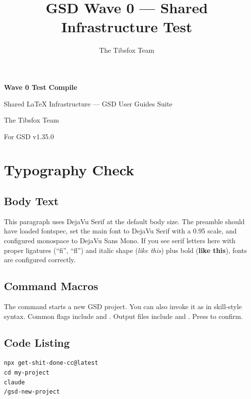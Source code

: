 \documentclass[11pt,letterpaper,openany]{book}
\title{GSD Wave 0 — Shared Infrastructure Test}
\author{The Tibsfox Team}
\begin{document}
\begin{titlepage}
\centering
\vspace*{2cm}
{\headingfont\Huge\bfseries\color{gsdnavy} Wave 0 Test Compile\par}
\vspace{0.5cm}
{\headingfont\Large Shared LaTeX Infrastructure — GSD User Guides Suite\par}
\vspace{2cm}
{\large The Tibsfox Team \par}
\vspace{0.5cm}
{\small For GSD v1.35.0 \par}
\vfill
{\footnotesize \cclicense\par}
\end{titlepage}

\tableofcontents
\clearpage

\chapter{Typography Check}
\section{Body Text}
This paragraph uses DejaVu Serif at the default body size. The preamble
should have loaded fontspec, set the main font to DejaVu Serif with a
0.95 scale, and configured monospace to DejaVu Sans Mono. If you see
serif letters here with proper ligatures (``fi'', ``fl'') and italic
shape (\textit{like this}) plus bold (\textbf{like this}), fonts are
configured correctly.

\section{Command Macros}
The  command starts a new GSD project. You can also
invoke it as  in skill-style syntax. Common flags
include  and . Output files include
 and .
Press  to confirm.

\section{Code Listing}
\begin{lstlisting}
npx get-shit-done-cc@latest
cd my-project
claude
/gsd-new-project
\end{lstlisting}
\end{document}

